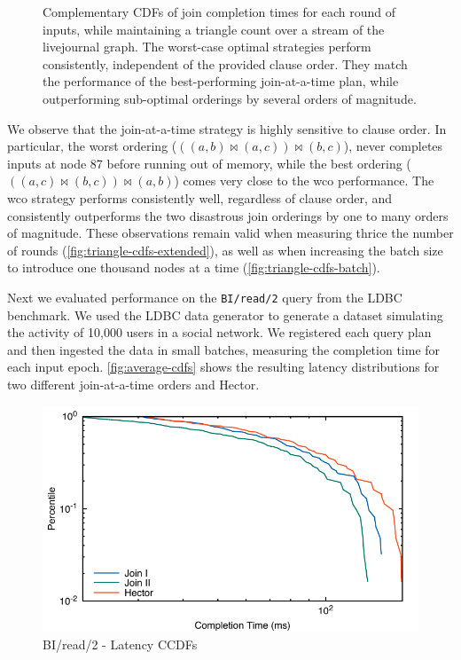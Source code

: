 \documentclass[../catalog.tex]{subfiles}
\begin{document}
\begin{figure}[h!]
  \medskip
  \small

  Complementary CDFs of join completion times for each round of
  inputs, while maintaining a triangle count over a stream of the
  livejournal graph. The worst-case optimal strategies perform
  consistently, independent of the provided clause order. They match
  the performance of the best-performing join-at-a-time plan, while
  outperforming sub-optimal orderings by several orders of magnitude.
\end{figure}

We observe that the join-at-a-time strategy is highly sensitive to
clause order. In particular, the worst ordering ($((a,b) \bowtie
(a,c)) \bowtie (b,c)$), never completes inputs at node 87 before
running out of memory, while the best ordering ($((a,c) \bowtie (b,c))
\bowtie (a,b)$) comes very close to the wco performance. The wco
strategy performs consistently well, regardless of clause order, and
consistently outperforms the two disastrous join orderings by one to
many orders of magnitude. These observations remain valid when
measuring thrice the number of rounds
(\autoref{fig:triangle-cdfs-extended}), as well as when increasing the
batch size to introduce one thousand nodes at a time
(\autoref{fig:triangle-cdfs-batch}).

Next we evaluated performance on the \texttt{BI/read/2} query from the
LDBC benchmark. We used the LDBC data generator to generate a dataset
simulating the activity of 10,000 users in a social network. We
registered each query plan and then ingested the data in small
batches, measuring the completion time for each input
epoch. \autoref{fig:average-cdfs} shows the resulting latency
distributions for two different join-at-a-time orders and Hector.

\begin{figure}[h!]
  \includegraphics[width=1.0\linewidth]{results/bi_read_2/out/all_cdfs}
  \caption{BI/read/2 - Latency CCDFs}
  \label{fig:average-cdfs}
\end{figure}
\end{document}
